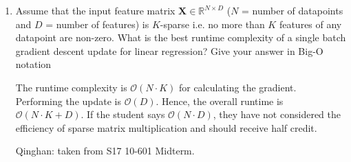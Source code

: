 \begin{enumerate}
\begin{enumerate}
        \item If we initialize the weight as $2.0$ and bias term as $0.0$, and set the learning rate as $0.1$, what is the weight and bias after one iteration of batch gradient descent? Note that we do not introduce any regularization in this problem and our objective function looks like $\frac{1}{N}\sum_{i=1}^{N} (wx_i + b - y_i)^2$, where $N$ is the number of data points, $w$ is the weight, and $b$ is the bias term.  
        
        \item Using the same objective function, initialization and learning rate, calculate the weight and bias after one iteration of stochastic gradient descent on the first data point, $x_1 = 1.0, y_1 = 1.0$. 

    \end{enumerate}
    
    \begin{soln}
    (a) weight = 2.5, bias = -1
    
    (b) weight = 2.0333, bias = 0
    
    (c) weight = 1.9, bias = -0.1
    \end{soln}
    
    \begin{qauthor}
    Qinghan: edited from S18 10-601 HW3
    \end{qauthor}
    
    \item Assume that the input feature matrix $\mathbf{X} \in \mathbb{R}^{N\times D}$ ($N$ = number of datapoints and $D$ = number of features) is $K$-sparse i.e. no more than $K$ features of any datapoint are non-zero. What is the best runtime complexity of a single batch gradient descent update for linear regression?  Give your answer in Big-O notation
    
    \begin{soln}
    The runtime complexity is $\mathcal{O}(N \cdot K)$ for calculating the gradient. Performing the update is $\mathcal{O}(D)$. Hence, the overall runtime is $\mathcal{O}(N \cdot K + D)$. If the student says $\mathcal{O}(N \cdot D)$, they have not considered the efficiency of sparse matrix multiplication and should receive half credit.
    \end{soln}
    
    \begin{qauthor}
    Qinghan: taken from S17 10-601 Midterm. 
    \end{qauthor}
    

\end{enumerate}
